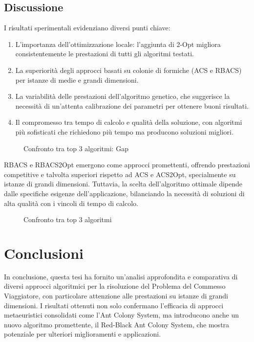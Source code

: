 \section{Discussione}
\label{sec:discussione}

I risultati sperimentali evidenziano diversi punti chiave:

\begin{enumerate}
	\item L'importanza dell'ottimizzazione locale: l'aggiunta di 2-Opt migliora consistentemente le prestazioni di tutti gli algoritmi testati.
	\item La superiorità degli approcci basati su colonie di formiche (ACS e RBACS) per istanze di medie e grandi dimensioni.
	\item La variabilità delle prestazioni dell'algoritmo genetico, che suggerisce la necessità di un'attenta calibrazione dei parametri per ottenere buoni risultati.
	\item Il compromesso tra tempo di calcolo e qualità della soluzione, con algoritmi più sofisticati che richiedono più tempo ma producono soluzioni migliori.
\end{enumerate}

\begin{figure}[h]
	\caption{Confronto tra top 3 algoritmi: Gap}
	\label{fig:alg_comparison_gap}
\end{figure}

RBACS e RBACS2Opt emergono come approcci promettenti, offrendo prestazioni competitive e talvolta superiori rispetto ad ACS e ACS2Opt, specialmente su istanze di grandi dimensioni. Tuttavia, la scelta dell'algoritmo ottimale dipende dalle specifiche esigenze dell'applicazione, bilanciando la necessità di soluzioni di alta qualità con i vincoli di tempo di calcolo.

\begin{figure}[h]
	\caption{Confronto tra top 3 algoritmi}
	\label{fig:alg_comparison_heatmap}
\end{figure}


\chapter{Conclusioni}
\label{chapt:8}
In conclusione, questa tesi ha fornito un'analisi approfondita e comparativa di diversi approcci algoritmici per la risoluzione del Problema del Commesso Viaggiatore, con particolare attenzione alle prestazioni su istanze di grandi dimensioni. I risultati ottenuti non solo confermano l'efficacia di approcci metaeuristici consolidati come l'Ant Colony System, ma introducono anche un nuovo algoritmo promettente, il Red-Black Ant Colony System, che mostra potenziale per ulteriori miglioramenti e applicazioni.


